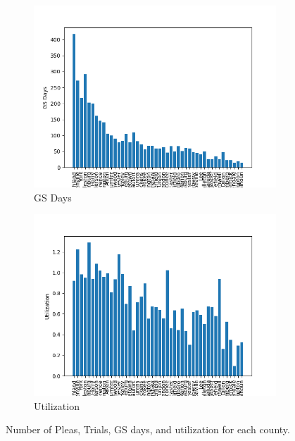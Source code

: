 \documentclass[11pt]{article}
\begin{document}
\begin{figure}[H]
\begin{subfigure}[b]{0.45\textwidth}
          \includegraphics[width=\textwidth]{../../../output/figures/Exploration/county_days.png}
          \caption{GS Days}

        \end{subfigure}
        \hfill
        \begin{subfigure}[b]{0.45\textwidth}

          \includegraphics[width=\textwidth]{../../../output/figures/Exploration/county_utilization.png}
          \caption{Utilization}

        \end{subfigure}
        \caption{Number of Pleas, Trials, GS days, and utilization for each county.}
        \label{fig-county}
    \end{figure}
\end{document}
